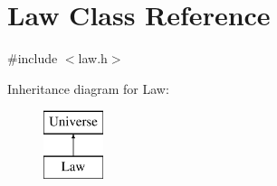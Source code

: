 \hypertarget{classLaw}{}\section{Law Class Reference}
\label{classLaw}


{\ttfamily \#include $<$law.\+h$>$}

Inheritance diagram for Law\+:\begin{figure}[H]
\begin{center}
\leavevmode
\includegraphics[height=2.000000cm]{classLaw}
\end{center}
\end{figure}
